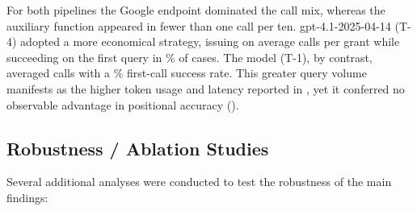 For both pipelines the Google \DIFdelbegin %
\DIFdelend \DIFaddbegin {}\DIFaddend endpoint dominated the call
mix, whereas the auxiliary \DIFdelbegin %
\DIFdelend \DIFaddbegin {}\DIFaddend function appeared in fewer
than one call per ten. gpt-4.1-2025-04-14 (T-4) adopted a more
economical strategy, issuing on average \DIFdelbegin {}\DIFdelend \DIFaddbegin {}\DIFaddend calls per grant while
succeeding on the first query in \DIFdelbegin {}\DIFdelend \DIFaddbegin {}\DIFaddend \% of cases. The \DIFdelbegin {}\DIFdelend \DIFaddbegin {}\DIFaddend model (T-1), by contrast, averaged \DIFdelbegin {}\DIFdelend \DIFaddbegin {}\DIFaddend calls with a \DIFdelbegin {}\DIFdelend \DIFaddbegin {}\DIFaddend \% first-call
success rate. This greater query volume manifests as the higher token
usage and latency reported in \DIFdelbegin {}\DIFdelend \DIFaddbegin {}, yet it conferred no
observable advantage in positional accuracy (\DIFdelbegin {}\DIFdelend \DIFaddbegin {}).

\subsection{Robustness / Ablation
Studies}\label{robustness-ablation-studies}

Several additional analyses were conducted to test the robustness of the
main findings:

